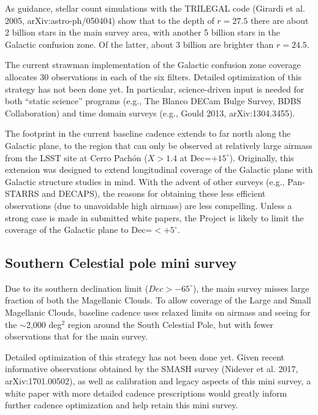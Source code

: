 \documentclass[DM,lsstdraft,toc,usenatbib]{lsstdoc}
\begin{document}
As guidance, stellar count simulations with the TRILEGAL code (Girardi et al. 2005, 
arXiv:astro-ph/050404) show that to the depth of $r=27.5$ there are about 2 billion
stars in the main survey area, with another 5 billion stars in the Galactic confusion 
zone. Of the latter, about 3 billion are brighter than $r=24.5$.  

The current strawman implementation of the Galactic confusion zone coverage allocates 
30 observations in each of the six filters. Detailed optimization of this strategy has not 
been done yet. In particular, science-driven input is needed for both ``static science''
programs (e.g., The Blanco DECam Bulge Survey, BDBS Collaboration) and  time domain
surveys (e.g., Gould 2013, arXiv:1304.3455). 

The footprint in the current baseline cadence extends to far north along the Galactic
plane, to the region that can only be observed at relatively large airmass from the LSST
site at Cerro Pach\'on ($X>1.4$ at Dec=$+15^\circ$). Originally, this extension was designed 
to extend longitudinal coverage of the Galactic plane with Galactic structure studies in mind. 
With the advent of other surveys (e.g., Pan-STARRS and DECAPS), the reasons for obtaining 
these less efficient observations (due to unavoidable high airmass) are less compelling. 
Unless a strong case is made in submitted white papers, the Project is likely to limit the 
coverage of the Galactic plane to Dec=$<+5^\circ$. 


\subsection{Southern Celestial pole mini survey}

Due to its southern declination limit ($Dec > -65^\circ$), the main survey misses large fraction
of both the Magellanic Clouds. To allow coverage of the Large and Small Magellanic Clouds, 
baseline cadence uses relaxed limits on airmass and seeing for the $\sim$2,000 deg$^2$ region 
around the South Celestial Pole, but with fewer observations that for the main survey. 

Detailed optimization of this strategy has not been done yet. Given recent informative observations 
obtained by the SMASH survey (Nidever et al. 2017, arXiv:1701.00502), as well as calibration 
and legacy aspects of this mini survey, a white paper with more detailed cadence prescriptions
would greatly inform further cadence optimization and help retain this mini survey. 
\end{document}
